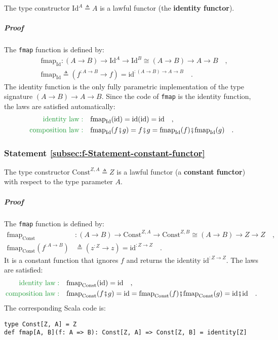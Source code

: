The type constructor $\text{Id}^{A}\triangleq A$ is a lawful functor
(the \textbf{identity functor}).

\subparagraph{Proof}

The \lstinline!fmap! function is defined by:
\begin{align*}
 & \text{fmap}_{\text{Id}}:\left(A\rightarrow B\right)\rightarrow\text{Id}^{A}\rightarrow\text{Id}^{B}\cong\left(A\rightarrow B\right)\rightarrow A\rightarrow B\quad,\\
 & \text{fmap}_{\text{Id}}\triangleq(f^{:A\rightarrow B}\rightarrow f)=\text{id}^{:(A\rightarrow B)\rightarrow A\rightarrow B}\quad.
\end{align*}
The identity function is the only fully parametric implementation
of the type signature $\left(A\rightarrow B\right)\rightarrow A\rightarrow B$.
Since the code of \lstinline!fmap! is the identity function, the
laws are satisfied automatically:
\begin{align*}
{\color{greenunder}\text{identity law}:}\quad & \text{fmap}_{\text{Id}}(\text{id})=\text{id}(\text{id})=\text{id}\quad,\\
{\color{greenunder}\text{composition law}:}\quad & \text{\ensuremath{\text{fmap}_{\text{Id}}}}(f\bef g)=f\bef g=\text{fmap}_{\text{Id}}(f)\bef\text{fmap}_{\text{Id}}(g)\quad.
\end{align*}


\subsubsection{Statement \label{subsec:f-Statement-constant-functor}\ref{subsec:f-Statement-constant-functor}}

The type constructor $\text{Const}^{Z,A}\triangleq Z$
is a lawful functor (a \textbf{constant functor}) with respect to
the type parameter $A$.

\subparagraph{Proof}

The \lstinline!fmap! function is defined by:
\begin{align*}
\text{fmap}_{\text{Const}} & :\left(A\rightarrow B\right)\rightarrow\text{Const}^{Z,A}\rightarrow\text{Const}^{Z,B}\cong\left(A\rightarrow B\right)\rightarrow Z\rightarrow Z\quad,\\
\text{fmap}_{\text{Const}}(f^{:A\rightarrow B}) & \triangleq(z^{:Z}\rightarrow z)=\text{id}^{:Z\rightarrow Z}\quad.
\end{align*}
It is a constant function that ignores $f$ and returns the identity
$\text{id}^{:Z\rightarrow Z}$. The laws are satisfied:
\begin{align*}
{\color{greenunder}\text{identity law}:}\quad & \text{fmap}_{\text{Const}}(\text{id})=\text{id}\quad,\\
{\color{greenunder}\text{composition law}:}\quad & \text{\ensuremath{\text{fmap}_{\text{Const}}}}(f\bef g)=\text{id}=\text{fmap}_{\text{Const}}(f)\bef\text{fmap}_{\text{Const}}(g)=\text{id}\bef\text{id}\quad.
\end{align*}
The corresponding Scala code is:
\begin{lstlisting}
type Const[Z, A] = Z
def fmap[A, B](f: A => B): Const[Z, A] => Const[Z, B] = identity[Z]
\end{lstlisting}

